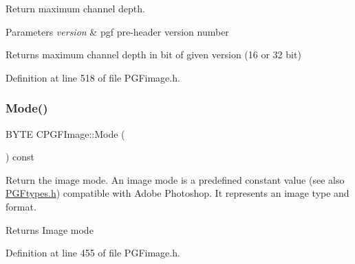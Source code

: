 Return maximum channel depth. 
\begin{DoxyParams}{Parameters}
{\em version} & pgf pre-\/header version number \\
\hline
\end{DoxyParams}
\begin{DoxyReturn}{Returns}
maximum channel depth in bit of given version (16 or 32 bit) 
\end{DoxyReturn}


Definition at line 518 of file P\+G\+Fimage.\+h.


\begin{DoxyCode}{0}

\end{DoxyCode}
\mbox{\label{classCPGFImage_a8c60aabdcf2556e9a425052e7f5b5d30}} 
\subsubsection{\texorpdfstring{Mode()}{Mode()}}
{\footnotesize\ttfamily B\+Y\+TE C\+P\+G\+F\+Image\+::\+Mode (\begin{DoxyParamCaption}{ }\end{DoxyParamCaption}) const\hspace{0.3cm}{\ttfamily [inline]}}

Return the image mode. An image mode is a predefined constant value (see also \mbox{\hyperlink{PGFtypes_8h}{P\+G\+Ftypes.\+h}}) compatible with Adobe Photoshop. It represents an image type and format. \begin{DoxyReturn}{Returns}
Image mode 
\end{DoxyReturn}


Definition at line 455 of file P\+G\+Fimage.\+h.


\begin{DoxyCode}{0}

\end{DoxyCode}
\mbox{\label{classCPGFImage_adbe9092b915a2c5b2361f4db186b991c}} 
